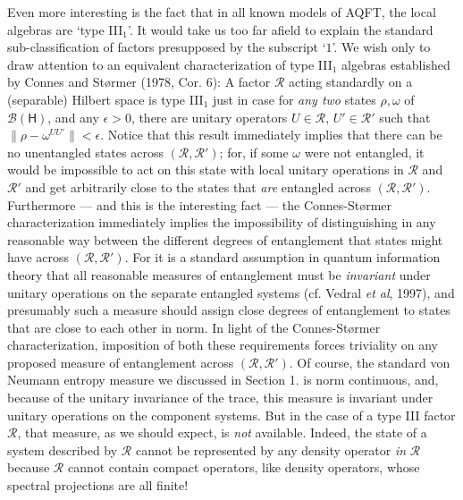 \documentclass[12pt]{article}
\newcommand{\alg}[1]{\mbox{$\mathcal{#1}$}}
\newcommand{\hil}[1]{\mbox{$\mathsf{#1}$}}
\begin{document}
 Even more interesting is the fact that in all known models of AQFT, the local algebras 
  are `type III$_{1}$'.  It would take us too far 
 afield to explain the standard sub-classification of factors presupposed by 
 the subscript `$1$'.  We wish only to draw attention to 
 an equivalent characterization of type III$_{1}$ algebras 
 established by Connes and St\o rmer 
 (1978, Cor. 6): A factor $\alg{R}$ acting standardly on a 
 (separable) Hilbert space is type III$_{1}$ just in case 
 for \emph{any two} states $\rho,\omega$ of $\alg{B}(\hil{H})$, and any 
 $\epsilon>0$, there are unitary operators 
 $U\in\alg{R}$, $U'\in\alg{R}'$ such 
 that $\|\rho-\omega^{UU'}\|<\epsilon$.  Notice that this result 
 immediately implies that there can be no unentangled states across 
 $(\alg{R},\alg{R}')$; for, if some $\omega$ were not entangled, it 
 would be impossible to act on this state with local unitary 
 operations in $\alg{R}$ and $\alg{R}'$ and get arbitrarily close to 
 the states that \emph{are} entangled across $(\alg{R},\alg{R}')$.  
 Furthermore --- and this is the interesting fact --- the Connes-St\o rmer characterization 
 immediately implies the  
 impossibility of distinguishing in any reasonable way between the different degrees of 
 entanglement that states might have across $(\alg{R},\alg{R}')$.  
 For it is a standard assumption in quantum information theory 
 that 
 all reasonable measures of entanglement must be \emph{invariant} under 
 unitary operations on the separate entangled systems (cf. Vedral 
 \emph{et al}, 1997), and presumably such a measure 
 should assign close 
 degrees of entanglement to states that are close to each other in 
 norm.  In light of the Connes-St\o rmer characterization, imposition 
 of
 both these requirements forces triviality on any 
 proposed measure of entanglement across $(\alg{R},\alg{R}')$.  
 Of course, the standard von Neumann 
 entropy measure we discussed in Section 1. is norm continuous, and, 
 because of the unitary invariance of the trace, this measure is 
 invariant under unitary operations on the component systems.  
 But in the case of a type III factor $\alg{R}$, that measure, as we 
 should expect, is 
 \emph{not} available.  Indeed, the state of a system described by $\alg{R}$ cannot be 
 represented by any density 
 operator \emph{in} $\alg{R}$ because $\alg{R}$  cannot contain compact operators, like 
 density operators, whose spectral projections 
 are all finite!  
  
\end{document}
